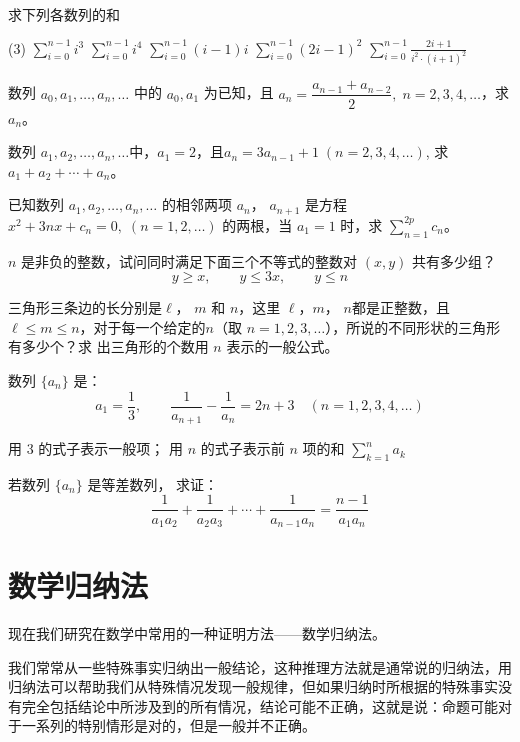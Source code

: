\begin{Exercise}
\begin{question}
\item 求下列各数列的和
\begin{tasks}(3)
    \task $\displaystyle \sum^{n-1}_{i=0} i^3$
    \task $\displaystyle \sum^{n-1}_{i=0} i^4$
    \task $\displaystyle \sum^{n-1}_{i=0} (i-1)i$
    \task $\displaystyle \sum^{n-1}_{i=0} (2i-1)^2$
    \task $\displaystyle \sum^{n-1}_{i=0} \frac{2i+1}{i^2\cdot (i+1)^2}$
\end{tasks}

\item 数列 $a_0,a_1,\ldots, a_n,\ldots$ 中的 $a_0,a_1$ 为已知，且 $a_n=\dfrac{a_{n-1}+a_{n-2}}{2},\; n=2,3,4,\ldots$，求 $a_n$。
\item 数列 $a_1,a_2,\ldots,a_n,\ldots$中，$a_1=2$，且$a_n=3a_{n-1}+1\; (n=2,3,4,\ldots )$, 求 $a_1+a_2+\cdots +a_n$。
\item 已知数列 $a_1,a_2,\ldots ,a_n,\ldots$ 的相邻两项 $a_n$，
$a_{n+1}$ 是方程 $x^2+3nx+c_n=0,\; (n=1,2,\ldots)$ 的两根，当 $a_1=1$ 时，求 $\sum\limits^{2p}_{n=1}c_n$。
\item $n$ 是非负的整数，试问同时满足下面三个不等式的整数对 $(x,y)$ 共有多少组？
\[y\geqslant x,\qquad y\leqslant 3x,\qquad y\leqslant n\]
\item 三角形三条边的长分别是$\ell$， $m$ 和 $n$，这里 $\ell$，$m$，
$n$都是正整数，且$\ell\leqslant m\leqslant n$，对于每一个给定的$n$（取
$n=1,2,3,\ldots$），所说的不同形状的三角形有多少个？求
出三角形的个数用 $n$ 表示的一般公式。
\item 数列 $\{a_n\}$ 是：
\[a_1=\frac{1}{3},\qquad \frac{1}{a_{n+1}}-\frac{1}{a_n}=2n+3\quad (n=1,2,3,4,\ldots)\]
\begin{tasks}
  \task 用 3 的式子表示一般项；
  \task 用 $n$ 的式子表示前 $n$ 项的和 $\displaystyle\sum^n_{k=1}a_k$
\end{tasks}

\item 若数列 $\{a_n\}$ 是等差数列，
求证：\[\frac{1}{a_1a_2}+\frac{1}{a_2a_3}+\cdots+\frac{1}{a_{n-1}a_n}=\frac{n-1}{a_1a_n}\]
\end{question}
\end{Exercise}

\section{数学归纳法}
现在我们研究在数学中常用的一种证明方法——数学归纳法。

我们常常从一些特殊事实归纳出一般结论，这种推理方法就是通常说的归纳法，用归纳法可以帮助我们从特殊情况发现一般规律，但如果归纳时所根据的特殊事实没有完全包括结论中所涉及到的所有情况，结论可能不正确，这就是说：命题可能对于一系列的特别情形是对的，但是一般并不正确。

